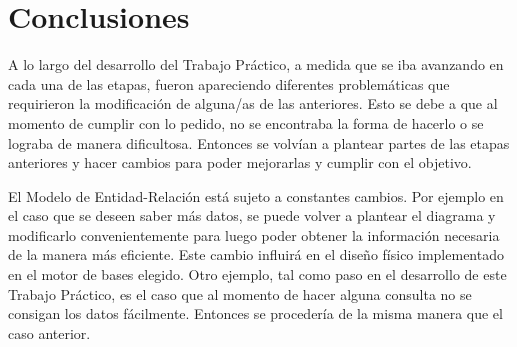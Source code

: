 \section{Conclusiones}

A lo largo del desarrollo del Trabajo Práctico, a medida que se iba avanzando en cada una de las etapas, fueron apareciendo diferentes problemáticas que requirieron la modificación de alguna/as de las anteriores. Esto se debe a que al momento de cumplir con lo pedido, no se encontraba la forma de hacerlo o se lograba de manera dificultosa. Entonces se volvían a plantear partes de las etapas anteriores y hacer cambios para poder mejorarlas y cumplir con el objetivo.

El Modelo de Entidad-Relación está sujeto a constantes cambios. Por ejemplo en el caso que se deseen saber más datos, se puede volver a plantear el diagrama y modificarlo convenientemente para luego poder obtener la información necesaria de la manera más eficiente. Este cambio influirá en el diseño físico implementado en el motor de bases elegido. Otro ejemplo, tal como paso en el desarrollo de este Trabajo Práctico, es el caso que al momento de hacer alguna consulta no se consigan los datos fácilmente. Entonces se procedería de la misma manera que el caso anterior.